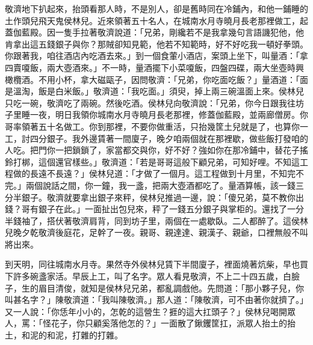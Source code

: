 敬濟地下扒起來，抬頭看那人時，不是別人，卻是舊時同在冷鋪內，和他一鋪睡的土作頭兒飛天鬼侯林兒。近來領著五十名人，在城南水月寺曉月長老那裡做工，起蓋伽藍殿。因一隻手拉著敬濟說道：「兄弟，剛纔若不是我拿幾句言語譏犯他，他肯拿出這五錢銀子與你？那賊卻知見範，他若不知範時，好不好吃我一頓好拳頭。你跟著我，咱往酒店內吃酒去來。」到一個食葷小酒店，案頭上坐下，叫量酒：「拿四賣嗄飯，兩大壺酒來。」不一時，量酒擺下小菜嗄飯，四盤四碟，兩大坐壺時興橄欖酒。不用小杯，拿大磁甌子，因問敬濟：「兄弟，你吃面吃飯？」量酒道：「面是溫淘，飯是白米飯。」敬濟道：「我吃面。」須臾，掉上兩三碗溫面上來。侯林兒只吃一碗，敬濟吃了兩碗。然後吃酒。侯林兒向敬濟說：「兄弟，你今日跟我往坊子里睡一夜，明日我領你城南水月寺曉月長老那裡，修蓋伽藍殿，並兩廊僧房。你哥率領著五十名做工。你到那裡，不要你做重活，只抬幾筐土兒就是了，也算你一工，討四分銀子。我外邊賃著一間廈子，晚夕咱兩個就在那裡歇，做些飯打發咱的人吃。把門你一把鎖鎖了，家當都交與你，好不好？強如你在那冷鋪中，替花子搖鈴打梆，這個還官樣些。」敬濟道：「若是哥哥這般下顧兄弟，可知好哩。不知這工程做的長遠不長遠？」侯林兒道：「才做了一個月。這工程做到十月里，不知完不完。」兩個說話之間，你一鐘，我一盞，把兩大壺酒都吃了。量酒算帳，該一錢三分半銀子。敬濟就要拿出銀子來秤，侯林兒推過一邊，說：「傻兄弟，莫不教你出錢？哥有銀子在此。」一面扯出包兒來，秤了一錢五分銀子與掌柜的。還找了一分半錢袖了，搭伏著敬濟肩背，同到坊子里，兩個在一處歇臥。二人都醉了。這侯林兒晚夕乾敬濟後庭花，足幹了一夜。親哥、親達達、親漢子、親爺，口裡無般不叫將出來。

到天明，同往城南水月寺。果然寺外侯林兒賃下半間廈子，裡面燒著炕柴，早也買下許多碗盞家活。早辰上工，叫了名字。眾人看見敬濟，不上二十四五歲，白臉子，生的眉目清俊，就知是侯林兒兄弟，都亂調戲他。先問道：「那小夥子兒，你叫甚名字？」陳敬濟道：「我叫陳敬濟。」那人道：「陳敬濟，可不由著你就擠了。」又一人說：「你恁年小小的，怎乾的這營生？捱的這大扛頭子？」侯林兒喝開眾人，罵：「怪花子，你只顧奚落他怎的？」一面散了鍬钁筐扛，派眾人抬土的抬土，和泥的和泥，打雜的打雜。

